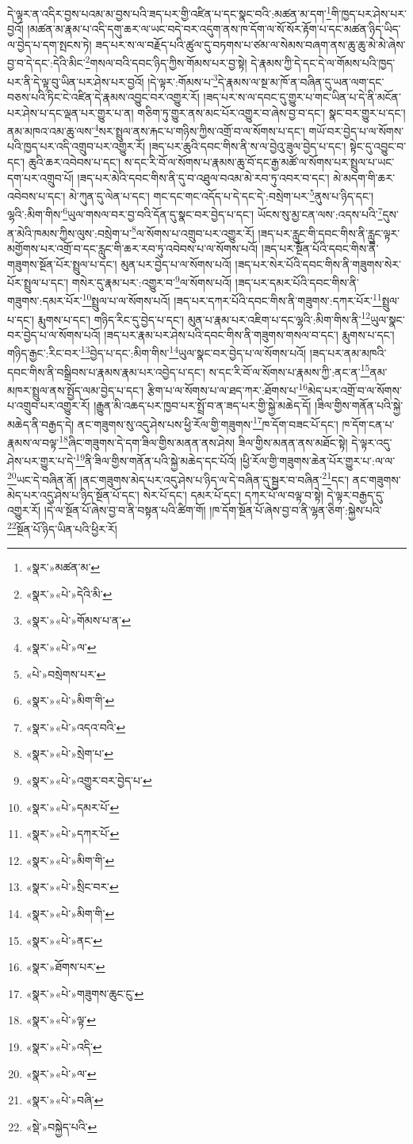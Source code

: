 དེ་ལྟར་ན་འདིར་བྱས་པའམ་མ་བྱས་པའི་ཟད་པར་གྱི་འཛིན་པ་དང་སྣང་བའི་:མཚན་མ་དག་\footnote{«སྣར་»མཚན་མ་}གི་ཁྱད་པར་ཤེས་པར་བྱའོ། །མཚན་མ་རྣམ་པ་འདི་དགུ་ཆར་ལ་ཡང་བདེ་བར་འདུག་ནས་ཁ་དོག་ལ་སོ་སོར་རྟོག་པ་དང་མཚན་ཉིད་ཡིད་ལ་བྱེད་པ་དག་སྤངས་ཏེ། ཟད་པར་ས་ལ་བརྗོད་པའི་ཚུལ་དུ་བཏགས་པ་ཙམ་ལ་སེམས་བཞག་ནས་ཆུ་ཆུ་མེ་མེ་ཞེས་བྱ་བ་དེ་དང་:དེའི་མིང་\footnote{«སྣར་»«པེ་»དེའི་མི་}གསལ་བའི་དབང་ཉིད་ཀྱིས་གོམས་པར་བྱ་སྟེ། དེ་རྣམས་ཀྱི་དེ་དང་དེ་ལ་གོམས་པའི་ཁྱད་པར་ནི་དེ་ལྟ་བུ་ཡིན་པར་ཤེས་པར་བྱའོ། །དེ་ལྟར་:གོམས་པ་\footnote{«སྣར་»«པེ་»གོམས་པ་ན་}དེ་རྣམས་ལ་སྔ་མ་ཁོ་ན་བཞིན་དུ་ཡན་ལག་དང་བཅས་པའི་ཏིང་ངེ་འཛིན་དེ་རྣམས་འབྱུང་བར་འགྱུར་རོ། །ཟད་པར་ས་ལ་དབང་དུ་གྱུར་པ་གང་ཡིན་པ་དེ་ནི་མངོན་པར་ཤེས་པ་དང་ལྡན་པར་གྱུར་པ་ན། གཅིག་ཏུ་གྱུར་ནས་མང་པོར་འགྱུར་བ་ཞེས་བྱ་བ་དང་། སྣང་བར་གྱུར་པ་དང་། ནམ་མཁའ་འམ་ཆུ་ལས་\footnote{«སྣར་»«པེ་»ལ་}སར་སྤྲུལ་ནས་རྐང་པ་གཉིས་ཀྱིས་འགྲོ་བ་ལ་སོགས་པ་དང་། གཡོ་བར་བྱེད་པ་ལ་སོགས་པའི་ཁྱད་པར་འདི་འགྲུབ་པར་འགྱུར་རོ། །ཟད་པར་ཆུའི་དབང་གིས་ནི་ས་ལ་བྱེའུ་ཟུལ་བྱེད་པ་དང་། སྟེང་དུ་འབྱུང་བ་དང་། ཆུའི་ཆར་འབེབས་པ་དང་། ས་དང་རི་བོ་ལ་སོགས་པ་རྣམས་ཆུ་བོ་དང་རྒྱ་མཚོ་ལ་སོགས་པར་སྤྲུལ་པ་ཡང་དག་པར་འགྲུབ་པོ། །ཟད་པར་མེའི་དབང་གིས་ནི་དུ་བ་འཐུལ་བའམ་མེ་རབ་ཏུ་འབར་བ་དང་། མེ་མདག་གི་ཆར་འབེབས་པ་དང་། མེ་ཀུན་དུ་ལེན་པ་དང་། གང་དང་གང་འདོད་པ་དེ་དང་དེ་:བསྲེག་པར་\footnote{«པེ་»བསྲེགས་པར་}ནུས་པ་ཉིད་དང་། ལྷའི་:མིག་གིས་\footnote{«སྣར་»«པེ་»མིག་གི་}ཡུལ་གསལ་བར་བྱ་བའི་དོན་དུ་སྣང་བར་བྱེད་པ་དང་། ཡོངས་སུ་མྱ་ངན་ལས་:འདས་པའི་\footnote{«སྣར་»«པེ་»འདའ་བའི་}དུས་ན་མེའི་ཁམས་ཀྱིས་ལུས་:བསྲེག་པ་\footnote{«སྣར་»«པེ་»སྲེག་པ་}ལ་སོགས་པ་འགྲུབ་པར་འགྱུར་རོ། །ཟད་པར་རླུང་གི་དབང་གིས་ནི་རླུང་ལྟར་མགྱོགས་པར་འགྲོ་བ་དང་རླུང་གི་ཆར་རབ་ཏུ་འབེབས་པ་ལ་སོགས་པའོ། །ཟད་པར་སྔོན་པོའི་དབང་གིས་ནི་གཟུགས་སྔོན་པོར་སྤྲུལ་པ་དང་། མུན་པར་བྱེད་པ་ལ་སོགས་པའོ། །ཟད་པར་སེར་པོའི་དབང་གིས་ནི་གཟུགས་སེར་པོར་སྤྲུལ་པ་དང་། གསེར་དུ་རྣམ་པར་:འགྱུར་བ་\footnote{«སྣར་»«པེ་»འགྱུར་བར་བྱེད་པ་}ལ་སོགས་པའོ། །ཟད་པར་དམར་པོའི་དབང་གིས་ནི་གཟུགས་:དམར་པོར་\footnote{«སྣར་»«པེ་»དམར་པོ་}སྤྲུལ་པ་ལ་སོགས་པའོ། །ཟད་པར་དཀར་པོའི་དབང་གིས་ནི་གཟུགས་:དཀར་པོར་\footnote{«སྣར་»«པེ་»དཀར་པོ་}སྤྲུལ་པ་དང་། རྨུགས་པ་དང་། གཉིད་རིང་དུ་བྱེད་པ་དང་། མུན་པ་རྣམ་པར་འཇིག་པ་དང་ལྷའི་:མིག་གིས་ནི་\footnote{«སྣར་»«པེ་»མིག་གི་}ཡུལ་སྣང་བར་བྱེད་པ་ལ་སོགས་པའོ། །ཟད་པར་རྣམ་པར་ཤེས་པའི་དབང་གིས་ནི་གཟུགས་གསལ་བ་དང་། རྨུགས་པ་དང་། གཉིད་རྒྱང་:རིང་བར་\footnote{«སྣར་»«པེ་»སྲིང་བར་}བྱེད་པ་དང་:མིག་གིས་\footnote{«སྣར་»«པེ་»མིག་གི་}ཡུལ་སྣང་བར་བྱེད་པ་ལ་སོགས་པའོ། །ཟད་པར་ནམ་མཁའི་དབང་གིས་ནི་བསྒྲིབས་པ་རྣམས་རྣམ་པར་འབྱེད་པ་དང་། ས་དང་རི་བོ་ལ་སོགས་པ་རྣམས་ཀྱི་:ནང་ན་\footnote{«སྣར་»«པེ་»ནང་}ནམ་མཁར་སྤྲུལ་ནས་སྤྱོད་ལམ་བྱེད་པ་དང་། རྩིག་པ་ལ་སོགས་པ་ལ་ཐད་ཀར་:ཐོགས་པ་\footnote{«སྣར་»ཐོགས་པར་}མེད་པར་འགྲོ་བ་ལ་སོགས་པ་འགྲུབ་པར་འགྱུར་རོ། །རྒྱུན་མི་འཆད་པར་ཁྱབ་པར་སྤྲོ་བ་ན་ཟད་པར་གྱི་སྐྱེ་མཆེད་དོ། །ཟིལ་གྱིས་གནོན་པའི་སྐྱེ་མཆེད་ནི་བརྒྱད་དེ། ནང་གཟུགས་སུ་འདུ་ཤེས་པས་ཕྱི་རོལ་གྱི་གཟུགས་\footnote{«སྣར་»«པེ་»གཟུགས་ཆུང་ངུ་}ཁ་དོག་བཟང་པོ་དང་། ཁ་དོག་ངན་པ་རྣམས་ལ་བལྟ་\footnote{«སྣར་»«པེ་»ལྟ་}ཞིང་གཟུགས་དེ་དག་ཟིལ་གྱིས་མནན་ནས་ཤེས། ཟིལ་གྱིས་མནན་ནས་མཐོང་སྟེ། དེ་ལྟར་འདུ་ཤེས་པར་གྱུར་པ་དེ་\footnote{«སྣར་»«པེ་»འདི་}ནི་ཟིལ་གྱིས་གནོན་པའི་སྐྱེ་མཆེད་དང་པོའོ། །ཕྱི་རོལ་གྱི་གཟུགས་ཆེན་པོར་གྱུར་པ་:ལ་ལ་\footnote{«སྣར་»«པེ་»ལ་}ཡང་དེ་བཞིན་ནོ། །ནང་གཟུགས་མེད་པར་འདུ་ཤེས་པ་ཉིད་ལ་དེ་བཞིན་དུ་སྦྱར་བ་བཞིན་\footnote{«སྣར་»«པེ་»བཞི་}དང་། ནང་གཟུགས་མེད་པར་འདུ་ཤེས་པ་ཉིད་སྔོན་པོ་དང་། སེར་པོ་དང་། དམར་པོ་དང་། དཀར་པོ་ལ་བལྟ་བ་སྟེ། དེ་ལྟར་བརྒྱད་དུ་འགྱུར་རོ། །དེ་ལ་སྔོན་པོ་ཞེས་བྱ་བ་ནི་བསྟན་པའི་ཚིག་གོ། །ཁ་དོག་སྔོན་པོ་ཞེས་བྱ་བ་ནི་ལྷན་ཅིག་:སྐྱེས་པའི་\footnote{«སྡེ་»བསྐྱེད་པའི་}སྔོན་པོ་ཉིད་ཡིན་པའི་ཕྱིར་རོ། 